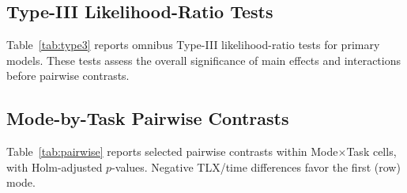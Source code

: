 \documentclass[sigconf]{acmart}
\begin{document}
\subsection{Type-III Likelihood-Ratio Tests}

Table~\ref{tab:type3} reports omnibus Type-III likelihood-ratio tests for primary models. These tests assess the overall significance of main effects and interactions before pairwise contrasts.

\begin{table}[h!]
  \centering
  \caption{Type-III LRTs for primary models (AI cohort for Mode effects; all participants for Condition trajectories). Significance codes: $^{*}p<0.05$, $^{***}p<0.001$.}
  \label{tab:type3}
  \small
\end{table}

\subsection{Mode-by-Task Pairwise Contrasts}

Table~\ref{tab:pairwise} reports selected pairwise contrasts within Mode\(\times\)Task cells, with Holm-adjusted \(p\)-values. Negative TLX/time differences favor the first (row) mode.
\end{document}
